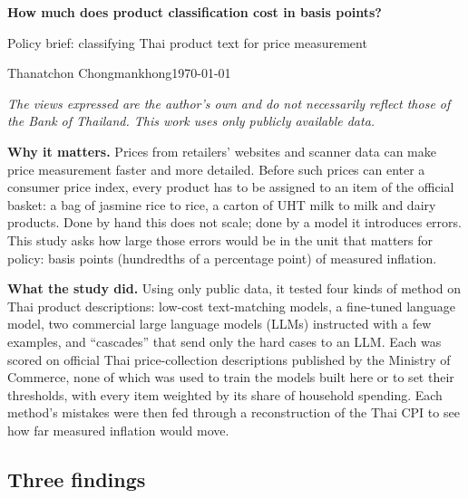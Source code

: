 \documentclass[11pt,a4paper]{article}
\begin{document}
{\Large\bfseries How much does product classification cost in basis points?}\par
\vspace{0.3em}
{\large Policy brief: classifying Thai product text for price measurement}\par
\vspace{0.4em}
Thanatchon Chongmankhong\quad\textbullet\quad \today\par
\vspace{0.3em}
{\small\itshape The views expressed are the author's own and do not necessarily reflect those
of the Bank of Thailand. This work uses only publicly available data.}
\vspace{0.8em}

\noindent\textbf{Why it matters.} Prices from retailers' websites and scanner data can make
price measurement faster and more detailed. Before such prices can enter a consumer price
index, every product has to be assigned to an item of the official basket: a bag of jasmine
rice to rice, a carton of UHT milk to milk and dairy products. Done by hand this does not
scale; done by a model it introduces errors. This study asks how large those errors would be
in the unit that matters for policy: basis points (hundredths of a percentage point) of
measured inflation.

\medskip\noindent\textbf{What the study did.} Using only public data, it tested four kinds of
method on Thai product descriptions: low-cost text-matching models, a fine-tuned language
model, two commercial large language models (LLMs) instructed with a few examples, and
``cascades'' that send only the hard cases to an LLM. Each was scored on \NRefSpecs{}
official Thai price-collection descriptions published by the Ministry of Commerce, none of
which was used to train the models built here or to set their thresholds, with every item weighted by its share
of household spending. Each method's mistakes were then fed through a reconstruction of the
Thai CPI to see how far measured inflation would move.

\subsection*{Three findings}
\end{document}
